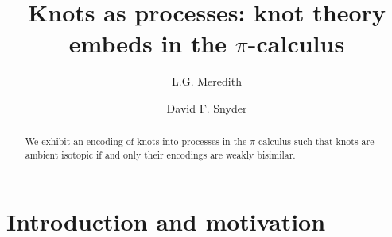 \documentclass[]{llncs}
\begin{document}
\title{Knots as processes: knot theory embeds in the $\pi$-calculus}

\author{ L.G. Meredith \and David F. Snyder }

\maketitle              %


\begin{abstract}

          We exhibit an encoding of knots into processes in the
          $\pi$-calculus such that knots are ambient isotopic if and
          only their encodings are weakly bisimilar.

\end{abstract}



\section{Introduction and motivation}
\end{document}

